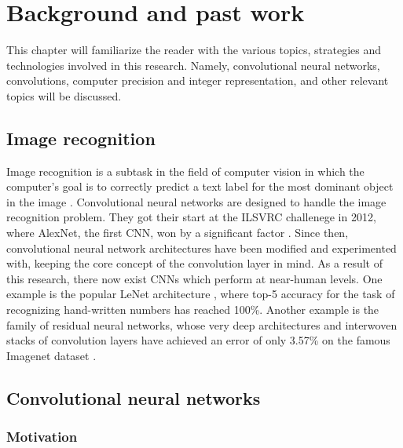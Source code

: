 \chapter{Background and past work}

This chapter will familiarize the reader with the various topics, strategies and technologies involved in this research. Namely, convolutional neural networks, convolutions, computer precision and integer representation, and other relevant topics will be discussed.

\section{Image recognition}
Image recognition is a subtask in the field of computer vision in which the computer's goal is to correctly predict a text label for the most dominant object in the image \cite{history}. Convolutional neural networks are designed to handle the image recognition problem. They got their start at the ILSVRC challenege in 2012, where AlexNet, the first CNN, won by a significant factor \cite{history}. Since then, convolutional neural network architectures have been modified and experimented with, keeping the core concept of the convolution layer in mind. As a result of this research, there now exist CNNs which perform at near-human levels. One example is the popular LeNet architecture \cite{mnist}, where top-5 accuracy for the task of recognizing hand-written numbers has reached 100\%. Another example is the family of residual neural networks, whose very deep architectures and interwoven stacks of convolution layers have achieved an error of only 3.57\% on the famous Imagenet dataset \cite{resnets2}.

\section{Convolutional neural networks}
\subsection{Motivation}
